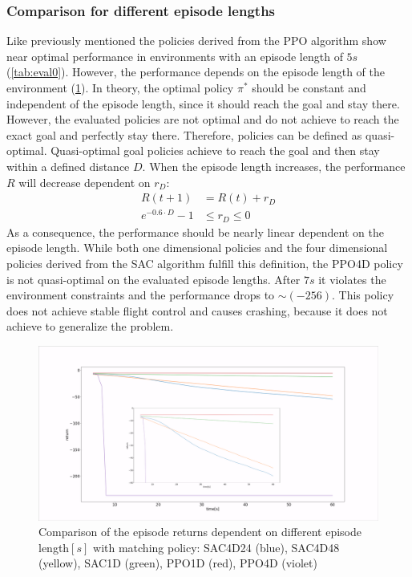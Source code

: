 \newpage

\subsubsection{Comparison for different episode lengths}
Like previously mentioned the policies derived from the PPO algorithm 
show near optimal performance in environments with an episode length 
of $5s$ (\cref{tab:eval0}). However, the performance depends on the
episode length of the environment (\cref{fig:timeRew}).
In theory, the optimal policy $\pi^*$ should be constant and independent
of the episode length, since it should reach the goal and stay there.
However, the evaluated policies are not optimal and do not achieve
to reach the exact goal and perfectly stay there.
Therefore, policies can be defined as quasi-optimal. 
Quasi-optimal goal policies achieve to reach the goal and then 
stay within a defined distance $D$. 
When the episode length increases,
the performance $R$ will decrease dependent on $r_D$:
\begin{align}
	R(t+1) &= R(t) + r_D \\
	e^{-0.6 \cdot D} - 1 &\leq r_D \leq 0
\end{align}
As a consequence,
the performance should be nearly linear dependent on the episode length.
While both one dimensional policies and the four dimensional policies
derived from the SAC algorithm fulfill this definition, 
the PPO4D policy is not quasi-optimal on the evaluated episode lengths.
After $7s$ it violates the environment constraints and the performance
drops to $\sim (-256)$. This policy does not achieve stable flight control and
causes crashing, because it does not achieve to generalize the problem.


\begin{figure}
	\centering
	\includegraphics[width=\linewidth]{figures/returntime.png}
	\caption{Comparison of the episode returns dependent on different episode length$[s]$
	with matching policy: 
	SAC4D24 (blue), 
	SAC4D48 (yellow), SAC1D (green),
	PPO1D (red),
	PPO4D (violet)}
	\label{fig:timeRew}
\end{figure}


